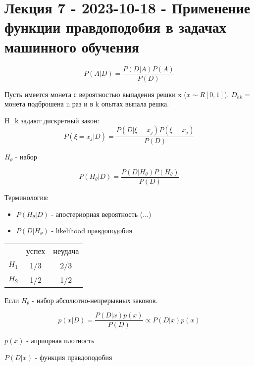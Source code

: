\section{Лекция 7 - 2023-10-18 - Применение функции правдоподобия в задачах машинного обучения}

\[
P(A|D) = \dfrac{P(D|A) P(A)}{P(D)}
\]

\begin{ex}
  Пусть имеется монета с вероятностью выпадения решки x ($x \sim R[0, 1]$).
  $D_{hk} = $ монета подброшена n раз и в k опытах выпала решка.
  
  H_k задают дискретный закон:
  $$P(\xi = x_j | D) = \dfrac{P(D|\xi=x_j) P(\xi=x_j)}{P(D)}$$

  $H_\theta$ - набор 

  $$P(H_\theta | D) = \dfrac{P(D|H_\theta) P(H_\theta)}{P(D)}$$

  Терминология:
  \begin{itemize}
    \item $P(H_\theta |D)$ - апостериорная вероятность ($\dots$)
    \item $P(D|H_\theta)$ - likelihood правдоподобия
  \end{itemize}
\end{ex}

\begin{ex}
  \begin{tabular}{|c|c|c|}
    & успех & неудача \\
    $H_1$ & 1/3 & 2/3 \\
    $H_2$ & 1/2 & 1/2
  \end{tabular}


\end{ex}

Если $H_\theta$ - набор абсолютно-непрерывных законов.

\[
  p(x|D) = \dfrac{P(D|x) p(x)}{P(D)} \propto P(D|x) p(x)
\]

$p(x)$ - априорная плотность

$P(D|x)$ - функция правдоподобия

